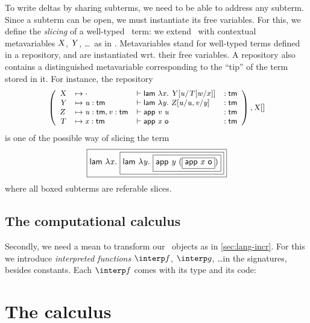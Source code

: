 \documentclass{llncs}
\begin{document}
To write deltas by sharing subterms, we need to be able to address any
subterm. Since a subterm can be open, we must instantiate its free
variables. For this, we define the \emph{slicing} of a well-typed \LF\
term: we extend \LF\ with contextual metavariables $\meta X$, $\meta
Y$, \ldots\ as in \cite{nanevski2008contextual}. Metavariables stand
for well-typed terms defined in a repository, and are instantiated
wrt. their free variables. A repository also contains a distinguished
metavariable corresponding to the ``tip'' of the term stored in
it. For instance, the repository
$$
\small
\left(\begin{array}{llll}
    \meta X &\mapsto
    \envnil&\vdash
    \app{\cst{lam}} \lam x \smeta Y {\msubst u {\smeta T {\msubst w x}}} &:
    \cst{tm}
    \\
    \meta Y &\mapsto
    \env u {\cst{tm}} &\vdash
    \app{\cst{lam}} \lam y \smeta Z {\msubstcons {\msubst u
      {\var u}} v {\var y} } &:
    \cst{tm}
    \\
    \meta Z &\mapsto
    \envcons {\env u {\cst{tm}}} v {\cst{tm}} &\vdash
    \app{\app{\cst{app}}{\var v}}{\var u} &:
    \cst{tm}
    \\
    \meta T &\mapsto
    \env x {\cst{tm}} &\vdash
    \app{\cst{app}}\app{\var x}{\cst{o}} &:
    \cst{tm}

\end{array}\right), \smeta X {}
$$
is one of the possible way of slicing the term
$$
\fbox{$
  \app {\cst{lam}} \lam x
  \fbox{$
    \app {\cst{lam}} \lam y
    \fbox{$
      \app {\cst{app}} \app {\var y}
      (\fbox{$
        \app{\cst{app}}\app{\var x}{\cst o}
      $})
    $}
  $}
$}
$$
where all boxed subterms are referable slices.

\subsection{The computational calculus}
\label{sec:comput}

Secondly, we need a mean to transform our \LF\ objects as in
\ref{sec:lang-incr}. For this we introduce \emph{interpreted
  functions} $\interp f$, $\interp g$, \ldots in the signatures,
besides constants. Each $\interp f$ comes with its type and its code:



\section{The calculus}
\end{document}
